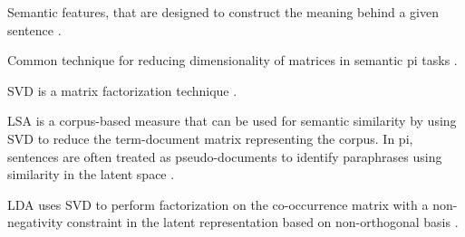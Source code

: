 \begin{definition}
    Semantic features, that are designed to construct the meaning behind a given sentence \cite{zhou_paraphrase_2025}.
\end{definition}

\begin{definition}
    Common technique for reducing dimensionality of matrices in semantic \ac{pi} tasks \cite{zhou_paraphrase_2025}.
\end{definition}

\begin{definition}
    SVD is a matrix factorization technique \cite{zhou_paraphrase_2025}.
\end{definition}

\begin{definition}
    LSA is a corpus-based measure that can be used for semantic similarity by using SVD to reduce the term-document matrix representing the corpus.
    In \ac{pi}, sentences are often treated as pseudo-documents to identify paraphrases using similarity in the latent space \cite{zhou_paraphrase_2025}.
\end{definition}

\begin{definition}
    LDA uses SVD to perform factorization on the co-occurrence matrix with a non-negativity constraint in the latent representation based on non-orthogonal basis \cite{zhou_paraphrase_2025}.
\end{definition}